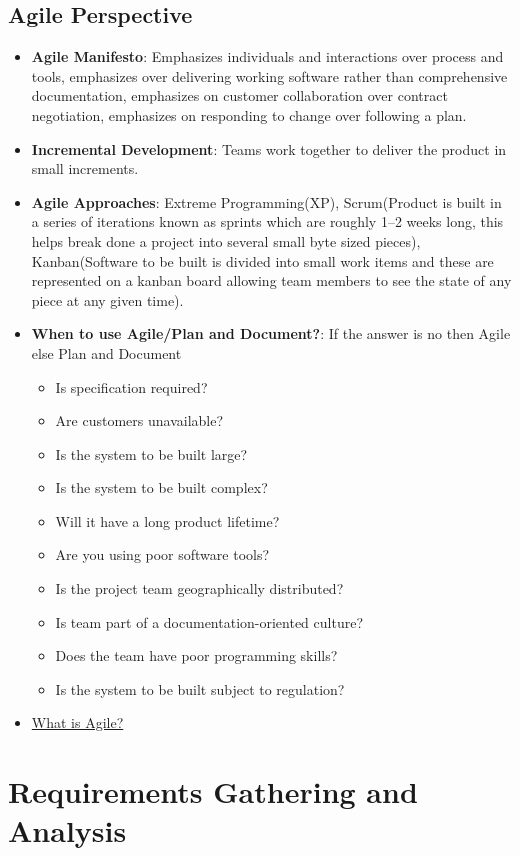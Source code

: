 \documentclass[a4paper]{article}
\begin{document}
\subsection{Agile Perspective}
\begin{itemize}
    \item \textbf{Agile Manifesto}: Emphasizes individuals and interactions over process and tools, emphasizes over delivering working software rather than comprehensive documentation, emphasizes on customer collaboration over contract negotiation, emphasizes on responding to change over following a plan.
    \item \textbf{Incremental Development}: Teams work together to deliver the product in small increments.
    \item \textbf{Agile Approaches}: Extreme Programming(XP), Scrum(Product is built in a series of iterations known as sprints which are roughly 1–2 weeks long, this helps break done a project into several small byte sized pieces), Kanban(Software to be built is divided into small work items and these are represented on a kanban board allowing team members to see the state of any piece at any given time).
    \item \textbf{When to use Agile/Plan and Document?}: If the answer is no then Agile else Plan and Document
    \begin{itemize}
        \item Is specification required?
        \item Are customers unavailable?
        \item Is the system to be built large?
        \item Is the system to be built complex?
        \item Will it have a long product lifetime?
        \item Are you using poor software tools?
        \item Is the project team geographically distributed?
        \item Is team part of a documentation-oriented culture?
        \item Does the team have poor programming skills?
        \item Is the system to be built subject to regulation?
    \end{itemize}
    \item \href{https://www.atlassian.com/agile}{What is Agile?}
\end{itemize}


\section{Requirements Gathering and Analysis}
\end{document}
